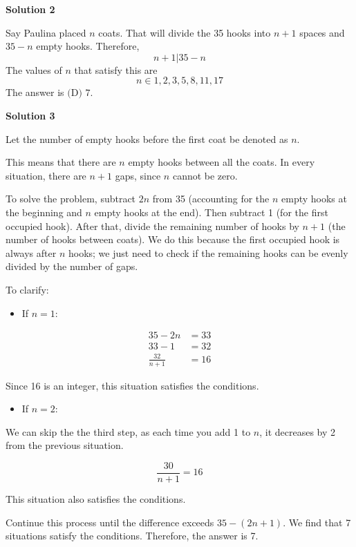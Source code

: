 \begin{enumerate}
 



\textbf{Solution 2}

Say Paulina placed $n$ coats. That will divide the 35 hooks into $n+1$ spaces and $35-n$ empty hooks. Therefore, 
 \[n+1|35-n\] The values of $n$ that satisfy this are 
 \[n\in{1,2,3,5,8,11,17}\]The answer is $\boxed{\text{(D) }7}$.

 



\textbf{Solution 3}

Let the number of empty hooks before the first coat be denoted as $n$.

 This means that there are $n$ empty hooks between all the coats. In every situation, there are $n + 1$ gaps, since $n$ cannot be zero.

 To solve the problem, subtract $2n$ from 35 (accounting for the $n$ empty hooks at the beginning and $n$ empty hooks at the end). Then subtract 1 (for the first occupied hook). After that, divide the remaining number of hooks by $n + 1$ (the number of hooks between coats). We do this because the first occupied hook is always after $n$ hooks; we just need to check if the remaining hooks can be evenly divided by the number of gaps.

 To clarify: 

 
            \begin{itemize}
        \item If $n = 1$:
            \end{itemize}
            \begin{align*}35 - 2n &= 33 \\33 - 1 &= 32 \\\frac{32}{n + 1} &= 16 \end{align*}


 Since 16 is an integer, this situation satisfies the conditions.

 
            \begin{itemize}
        \item If $n = 2$:
            \end{itemize}
            We can skip the the third step, as each time you add 1 to $n$, it decreases by 2 from the previous situation.

 
 \[\frac{30}{n + 1} = 16\]

 This situation also satisfies the conditions.

 Continue this process until the difference exceeds $35 - (2n + 1)$. We find that 7 situations satisfy the conditions. Therefore, the answer is 7.


\end{enumerate}
